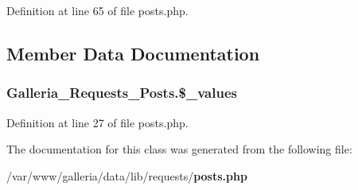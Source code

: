 Definition at line 65 of file posts.php.

\subsection{Member Data Documentation}
\subsubsection{\setlength{\rightskip}{0pt plus 5cm}Galleria\_\-Requests\_\-Posts.\$\_\-values\hspace{0.3cm}{\tt  [protected]}}\label{classGalleria__Requests__Posts_23ceaf293498c2ae355c399c0c49f728}




Definition at line 27 of file posts.php.

The documentation for this class was generated from the following file:\begin{CompactItemize}
\item 
/var/www/galleria/data/lib/requests/{\bf posts.php}\end{CompactItemize}
